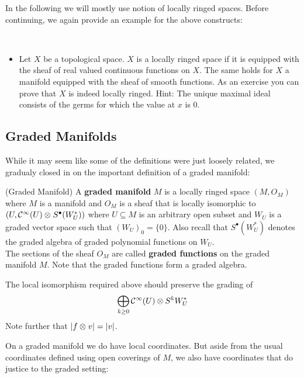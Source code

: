 In the following we will mostly use notion of locally ringed spaces. Before continuing, we again provide an example for the above constructs:

\begin{example}~
  \begin{itemize}
    \item Let $X$ be a topological space. $X$ is a locally ringed space if it is equipped with the sheaf of real valued continuous functions on $X$. The same holds for $X$ a manifold equipped with the sheaf of smooth functions. As an exercise you can prove that $X$ is indeed locally ringed. Hint: The unique maximal ideal consists of the germs for which the value at $x$ is $0$.
  \end{itemize}
\end{example}

\newpage
\subsection{Graded Manifolds}

While it may seem like some of the definitions were just loosely related, we gradualy closed in on the important definition of a graded manifold:

\begin{definition} (Graded Manifold)
  A \textbf{graded manifold} $M$ is a locally ringed space $(M, O_M)$ where $M$ is a manifold and $O_M$ is a sheaf that is locally isomorphic to $(U, \mathcal{C}^{\infty}(U) \mathbin{\mathop{\otimes}\displaylimits_{}} S^\bullet(W_U^*))$ where $U\subseteq M$ is an arbitrary open subset and $W_U$ is a graded vector space such that $(W_U)_0 = \{0\}$. Also recall that $S^\bullet(W_U^*)$ denotes the graded algebra of graded polynomial functions on $W_U$.\\

  The sections of the sheaf $O_M$ are called \textbf{graded functions} on the graded manifold $M$. Note that the graded functions form a graded algebra.
\end{definition}

\begin{rem}
  The local isomorphism required above should preserve the grading of
  $$ \bigoplus_{k \geq 0} \mathcal{C}^{\infty}(U) \mathbin{\mathop{\otimes}\displaylimits_{}} S^k W_U^*$$
  Note further that $|f  \mathbin{\mathop{\otimes}\displaylimits_{}} v| = |v|$.
\end{rem}

On a graded manifold we do have local coordinates. But aside from the usual coordinates defined using open coverings of $M$, we also have coordinates that do justice to the graded setting:\\


